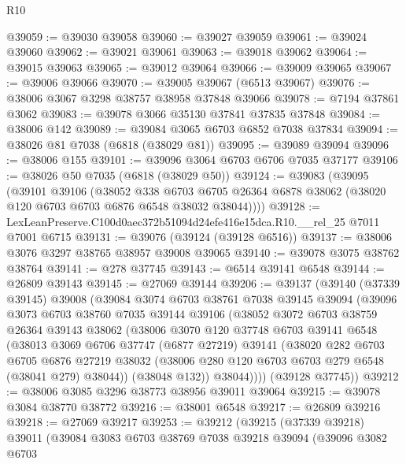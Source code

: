 \begin{lexlean}{R10}
\begin{coremodule}
@39059 := @39030 @39058
@39060 := @39027 @39059
@39061 := @39024 @39060
@39062 := @39021 @39061
@39063 := @39018 @39062
@39064 := @39015 @39063
@39065 := @39012 @39064
@39066 := @39009 @39065
@39067 := @39006 @39066
@39070 := @39005 @39067 (@6513 @39067)
@39076 := @38006 @3067 @3298 @38757 @38958 @37848 @39066
@39078 := @7194 @37861 @3062
@39083 := @39078 @3066 @35130 @37841 @37835 @37848
@39084 := @38006 @142
@39089 := @39084 @3065 @6703 @6852 @7038 @37834
@39094 := @38026 @81 @7038 (@6818 (@38029 @81))
@39095 := @39089 @39094
@39096 := @38006 @155
@39101 := @39096 @3064 @6703 @6706 @7035 @37177
@39106 := @38026 @50 @7035 (@6818 (@38029 @50))
@39124 := @39083
    (@39095
      (@39101
        @39106
        (@38052
          @338
          @6703
          @6705
          @26364
          @6878
          @38062
          (@38020 @120 @6703 @6703 @6876 @6548 @38032 @38044))))
@39128 := LexLeanPreserve.C100d0aec372b51094d24efe416e15dca.R10.__rel_25 @7011 @7001 @6715
@39131 := @39076 (@39124 (@39128 @6516))
@39137 := @38006 @3076 @3297 @38765 @38957 @39008 @39065
@39140 := @39078 @3075 @38762 @38764
@39141 := @278 @37745
@39143 := @6514 @39141 @6548
@39144 := @26809 @39143
@39145 := @27069 @39144
@39206 := @39137
    (@39140
      (@37339 @39145)
      @39008
      (@39084
        @3074
        @6703
        @38761
        @7038
        @39145
        @39094
        (@39096
          @3073
          @6703
          @38760
          @7035
          @39144
          @39106
          (@38052
            @3072
            @6703
            @38759
            @26364
            @39143
            @38062
            (@38006
              @3070
              @120
              @37748
              @6703
              @39141
              @6548
              (@38013
                @3069
                @6706
                @37747
                (@6877 @27219)
                @39141
                (@38020
                  @282
                  @6703
                  @6705
                  @6876
                  @27219
                  @38032
                  (@38006 @280 @120 @6703 @6703 @279 @6548 (@38041 @279) @38044))
                (@38048 @132))
              @38044))))
      (@39128 @37745))
@39212 := @38006 @3085 @3296 @38773 @38956 @39011 @39064
@39215 := @39078 @3084 @38770 @38772
@39216 := @38001 @6548
@39217 := @26809 @39216
@39218 := @27069 @39217
@39253 := @39212
    (@39215
      (@37339 @39218)
      @39011
      (@39084
        @3083
        @6703
        @38769
        @7038
        @39218
        @39094
        (@39096
          @3082
          @6703

\end{coremodule}
\end{lexlean}
